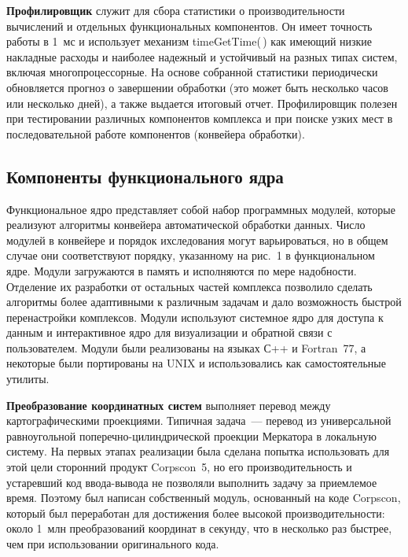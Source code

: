 \begin{multicols}{2}
   \textbf{Профилировщик} служит для сбора статистики о 
производительности вычислений и отдельных функциональных компонентов. 
Он имеет точность работы в 1~мс и использует механизм 
timeGetTime(\,) как имеющий низкие накладные расходы и наиболее надежный 
и устойчивый на разных типах систем, включая многопроцессорные. На основе 
собранной статистики периодически обновляется прогноз о завершении 
обработки (это может быть несколько часов или несколько дней), а также 
выдается итоговый отчет. Профилировщик полезен при тестировании 
различных компонентов комплекса и при поиске узких мест в 
последовательной работе компонентов (конвейера обработки).
   
\subsection{Компоненты функционального ядра} %

   Функциональное ядро представляет собой набор программных модулей, 
которые реализуют алгоритмы конвейера автоматической обработки  данных. 
Число модулей в конвейере и порядок их\linebreak следования могут варьироваться, но в 
общем случае они соответствуют порядку, указанному на рис.~1 в 
функциональном ядре. Модули загружаются в память и исполняются по мере 
надобности. Отделение их разработки от остальных частей комплекса 
позволило сделать алгоритмы более адаптивными к различным задачам и дало 
возможность быстрой перенастройки комплексов. Модули используют 
системное ядро для доступа к данным и интерактивное ядро для визуализации и 
обратной связи с пользователем. Модули были реализованы на языках С++ и 
Fortran~77, а некоторые были портированы на UNIX и использовались как 
самостоятельные утилиты.
   
   \textbf{Преобразование координатных систем} выполняет перевод между 
картографическими проекциями. Типичная задача~--- перевод из 
универсальной равноугольной поперечно-цилиндрической проекции Меркатора 
в локальную систему. На первых этапах реализации была сделана попытка 
использовать для этой цели сторонний продукт Corpscon~5, но его 
производительность и устаревший код ввода-вывода не позволяли выполнить 
задачу за приемлемое время. Поэтому был написан собственный модуль, 
основанный на коде Corpscon, который был переработан для достижения более 
высокой производительности: около 1~млн преобразований координат в 
секунду, что в несколько раз быстрее, чем при использовании оригинального 
кода.
   

\end{multicols}
